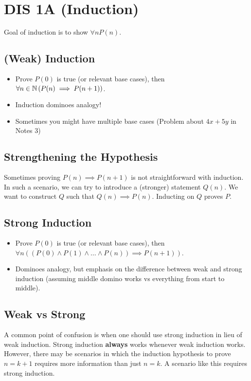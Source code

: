 \section{DIS 1A (Induction)}

Goal of induction is to show $\forall n P(n)$. 
\subsection{(Weak) Induction}
\begin{itemize}
    \item Prove $P(0)$ is true (or relevant base cases), then $\forall n \in \operatorname{\mathbb{N}} \left(P(n) \implies P(n+1)\right)$. 
    \item Induction dominoes analogy! 
    \item Sometimes you might have multiple base cases (Problem about $4x+5y$ in Notes 3)
\end{itemize}

\subsection{Strengthening the Hypothesis}

Sometimes proving $P(n) \implies P(n+1)$ is not straightforward with induction. In such a scenario, we can try to introduce a (stronger) statement $Q(n)$. We want to construct $Q$ such that $Q(n) \implies P(n)$. Inducting on $Q$ proves $P$. 

\subsection{Strong Induction}
\begin{itemize}
    \item Prove $P(0)$ is true (or relevant base cases), then $\forall n \left(\left(P(0) \land P(1) \land \dots \land P(n)\right) \implies P(n+1)\right)$. 
    \item Dominoes analogy, but emphasis on the difference between weak and strong induction (assuming middle domino works vs everything from start to middle).   
\end{itemize}

\subsection{Weak vs Strong}

A common point of confusion is when one should use strong induction in lieu of weak induction. Strong induction \textbf{always} works whenever weak induction works. However, there may be scenarios in which the induction hypothesis to prove $n=k+1$ requires more information than just $n=k$. A scenario like this requires strong induction.
